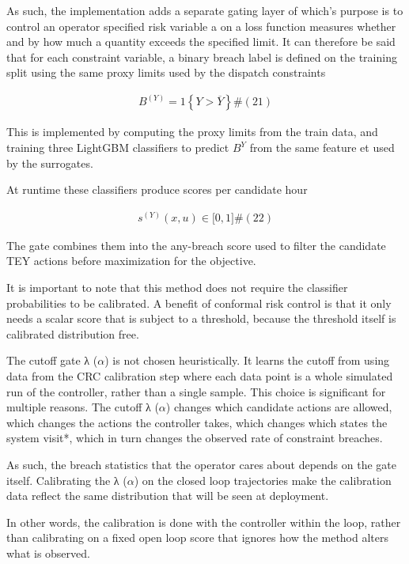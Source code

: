 \documentclass[11pt]{article}
\begin{document}
As such, the implementation adds a separate gating layer of which's
purpose is to control an operator specified risk variable a on a loss
function measures whether and by how much a quantity exceeds the
specified limit. It can therefore be said that for each constraint
variable, a binary breach label is defined on the training split using
the same proxy limits used by the dispatch constraints

\[\begin{array}{r}
B^{(Y)} = 1\left\{ Y > \overline{Y} \right\}\#(21)
\end{array}\]

This is implemented by computing the proxy limits from the train data,
and training three LightGBM classifiers to predict \(B^{Y}\) from the
same feature et used by the surrogates.

At runtime these classifiers produce scores per candidate hour

\[\begin{array}{r}
s^{(Y)}(x,u) \in \lbrack 0,1\rbrack\#(22)
\end{array}\]

The gate combines them into the any-breach score used to filter the
candidate TEY actions before maximization for the objective.

It is important to note that this method does not require the classifier
probabilities to be calibrated. A benefit of conformal risk control is
that it only needs a scalar score that is subject to a threshold,
because the threshold itself is calibrated distribution free.

The cutoff gate λ (\(\alpha\)) is not chosen heuristically. It learns
the cutoff from using data from the CRC calibration step where each data
point is a whole simulated run of the controller, rather than a single
sample. This choice is significant for multiple reasons. The cutoff λ
(\(\alpha\)) changes which candidate actions are allowed, which changes
the actions the controller takes, which changes which states the system
visit*, which in turn changes the observed rate of constraint breaches.

As such, the breach statistics that the operator cares about depends on
the gate itself. Calibrating the λ (\(\alpha\)) on the closed loop
trajectories make the calibration data reflect the same distribution
that will be seen at deployment.

In other words, the calibration is done with the controller within the
loop, rather than calibrating on a fixed open loop score that ignores
how the method alters what is observed.
\end{document}
